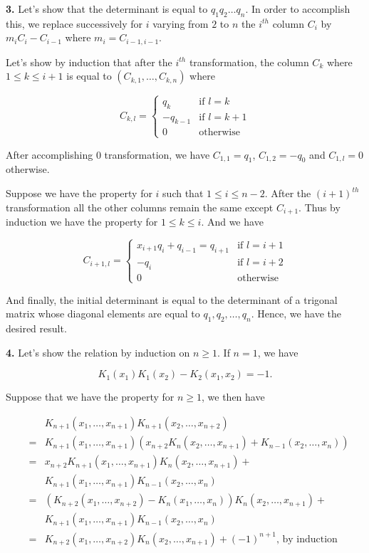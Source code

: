 \documentclass[a4paper,12pt]{article}
\newcommand{\newpar}[1]{\bigskip \noindent \textbf{#1.}}
\begin{document}
\newpar{3}  Let's show that the determinant is equal to $q_1q_2\ldots
q_n$.  In order to accomplish this, we replace successively for $i$
varying from $2$ to $n$ the $i^{th}$ column $C_i$ by $m_iC_i -
C_{i-1}$ where $m_i = C_{i-1,i-1}$.

Let's show by induction that after the $i^{th}$ transformation, the
column $C_k$ where $1\le k\le i+1$ is equal to
$(C_{k,1},\ldots,C_{k,n})$ where

\[
C_{k,l} = \left\{
\begin{array}{ll}
  q_k &\mbox{if $l=k$} \\
  -q_{k-1}& \mbox{if $l=k+1$} \\
  0& \mbox{otherwise}
\end{array}
\right.
\]

After accomplishing $0$ transformation, we have $C_{1,1} = q_1$,
$C_{1, 2} = -q_0$ and $C_{1, l} = 0$ otherwise.

Suppose we have the property for $i$ such that $1\le i\le n-2$.  After
the $(i+1)^{th}$ transformation all the other columns remain the same
except $C_{i+1}$.  Thus by induction we have the property for $1\le
k\le i$.  And we have

\[
C_{i+1,l} = \left\{
\begin{array}{ll}
  x_{i+1}q_i + q_{i-1} = q_{i+1} &\mbox{if $l=i+1$} \\
  -q_i& \mbox{if $l=i+2$} \\
  0& \mbox{otherwise}
\end{array}
\right.
\]

And finally, the initial determinant is equal to the determinant of a
trigonal matrix whose diagonal elements are equal to $q_1, q_2,
\ldots, q_n$.  Hence, we have the desired result.

\newpar{4} Let's show the relation by induction on $n \ge 1$.  If
$n=1$, we have

\[ K_1(x_1)K_1(x_2) - K_2(x_1,x_2) = -1.\]

Suppose that we have the property for $n \ge 1$, we then have

\begin{eqnarray*}
  &&K_{n+1}(x_1,\ldots,x_{n+1})K_{n+1}(x_2,\ldots,x_{n+2}) \\
  &=& K_{n+1}(x_1,\ldots,x_{n+1})(x_{n+2}K_n(x_2,\ldots,x_{n+1}) +
  K_{n-1}(x_2,\ldots,x_n)) \\
  &=& x_{n+2} K_{n+1}(x_1,\ldots, x_{n+1}) K_n(x_2,\ldots,x_{n+1}) + \\
  &&K_{n+1}(x_1,\ldots,x_{n+1}) K_{n-1}(x_2,\ldots,x_n) \\
  &=& (K_{n+2}(x_1,\ldots,x_{n+2}) - K_n(x_1,\ldots, x_n))
  K_n(x_2,\ldots,x_{n+1}) + \\
  && K_{n+1}(x_1,\ldots,x_{n+1}) K_{n-1}(x_2,\ldots,x_n) \\
  &=& K_{n+2}(x_1,\ldots,x_{n+2})K_n(x_2,\ldots,x_{n+1}) +
  (-1)^{n+1},\,\mbox{by induction}
\end{eqnarray*}
\end{document}
